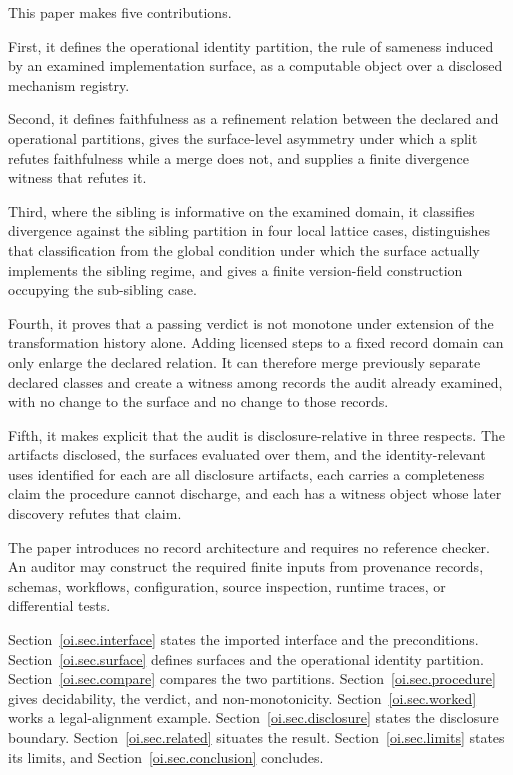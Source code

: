 \documentclass[11pt]{article}
\theoremstyle{plain}
\theoremstyle{definition}
\theoremstyle{remark}
\begin{document}
This paper makes five contributions.

First, it defines the operational identity partition,
the rule of sameness induced
by an examined implementation surface,
as a computable object over a disclosed mechanism registry.

Second, it defines faithfulness as a refinement relation
between the declared and operational partitions,
gives the surface-level asymmetry under which a split refutes faithfulness
while a merge does not,
and supplies a finite divergence witness that refutes it.

Third, where the sibling is informative on the examined domain,
it classifies divergence against the sibling partition
in four local lattice cases,
distinguishes that classification from the global condition
under which the surface actually implements the sibling regime,
and gives a finite version-field construction
occupying the sub-sibling case.

Fourth, it proves that a passing verdict is not monotone
under extension of the transformation history alone.
Adding licensed steps to a fixed record domain
can only enlarge the declared relation.
It can therefore merge previously separate declared classes
and create a witness among records the audit already examined,
with no change to the surface and no change to those records.

Fifth, it makes explicit that the audit is disclosure-relative in three respects.
The artifacts disclosed,
the surfaces evaluated over them,
and the identity-relevant uses identified for each
are all disclosure artifacts,
each carries a completeness claim the procedure cannot discharge,
and each has a witness object whose later discovery refutes that claim.

The paper introduces no record architecture and requires no reference checker.
An auditor may construct the required finite inputs
from provenance records, schemas, workflows, configuration,
source inspection, runtime traces, or differential tests.

Section~\ref{oi.sec.interface} states the imported interface and the preconditions.
Section~\ref{oi.sec.surface} defines surfaces and the operational identity partition.
Section~\ref{oi.sec.compare} compares the two partitions.
Section~\ref{oi.sec.procedure} gives decidability, the verdict, and non-monotonicity.
Section~\ref{oi.sec.worked} works a legal-alignment example.
Section~\ref{oi.sec.disclosure} states the disclosure boundary.
Section~\ref{oi.sec.related} situates the result.
Section~\ref{oi.sec.limits} states its limits, and
Section~\ref{oi.sec.conclusion} concludes.
\end{document}
